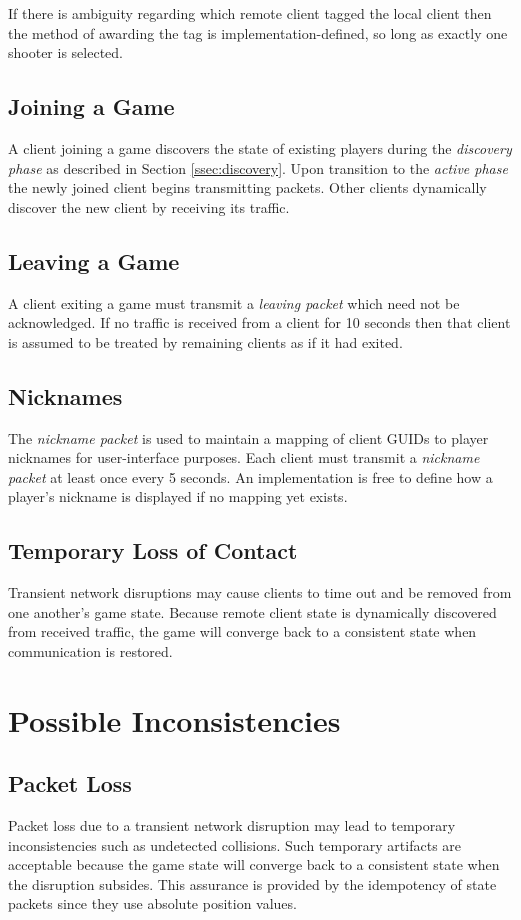 \documentclass{article}
\begin{document}
If there is ambiguity regarding which remote client tagged the local
client then the method of awarding the tag is implementation-defined, so
long as exactly one shooter is selected.

\subsection{Joining a Game}
A client joining a game discovers the state of existing players during
the \textit{discovery phase} as described in Section \ref{ssec:discovery}.
Upon transition to the \textit{active phase} the newly joined client
begins transmitting packets.  Other clients dynamically discover the new
client by receiving its traffic.

\subsection{Leaving a Game}
A client exiting a game must transmit a \textit{leaving packet} which
need not be acknowledged.  If no traffic is received from a client for
10 seconds then that client is assumed to be treated by remaining
clients as if it had exited.

\subsection{Nicknames}
The \textit{nickname packet} is used to maintain a mapping of client
GUIDs to player nicknames for user-interface purposes.  Each client must
transmit a \textit{nickname packet} at least once every 5 seconds.  An
implementation is free to define how a player's nickname is displayed if
no mapping yet exists.

\subsection{Temporary Loss of Contact}
Transient network disruptions may cause clients to time out and be
removed from one another's game state.   Because remote client state
is dynamically discovered from received traffic, the game will converge
back to a consistent state when communication is restored.

\section{Possible Inconsistencies}

\subsection{Packet Loss}
Packet loss due to a transient network disruption may lead to temporary
inconsistencies such as undetected collisions.  Such temporary artifacts
are acceptable because the game state will converge back to a consistent
state when the disruption subsides.  This assurance is provided by the
idempotency of state packets since they use absolute position values.
\end{document}
